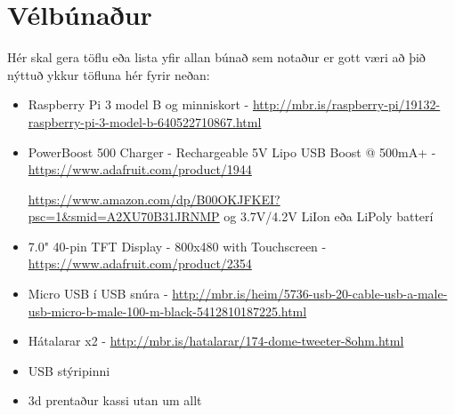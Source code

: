 \section{Vélbúnaður}
Hér skal gera töflu eða lista yfir allan búnað sem notaður er gott væri að þið nýttuð ykkur töfluna hér fyrir neðan:

\begin{itemize}  
\item Raspberry Pi 3 model B og minniskort - \url{http://mbr.is/raspberry-pi/19132-raspberry-pi-3-model-b-640522710867.html}
\item PowerBoost 500 Charger - Rechargeable 5V Lipo USB Boost @ 500mA+ -  \url{https://www.adafruit.com/product/1944}

 \url{https://www.amazon.com/dp/B00OKJFKEI?psc=1&smid=A2XU70B31JRNMP}
og 3.7V/4.2V LiIon eða LiPoly batterí
\item 7.0" 40-pin TFT Display - 800x480 with Touchscreen -  \url{https://www.adafruit.com/product/2354}
\item Micro USB í USB snúra - \url{http://mbr.is/heim/5736-usb-20-cable-usb-a-male-usb-micro-b-male-100-m-black-5412810187225.html}
\item Hátalarar x2 - \url{http://mbr.is/hatalarar/174-dome-tweeter-8ohm.html}
\item USB stýripinni 
\item 3d prentaður kassi utan um allt
\end{itemize}